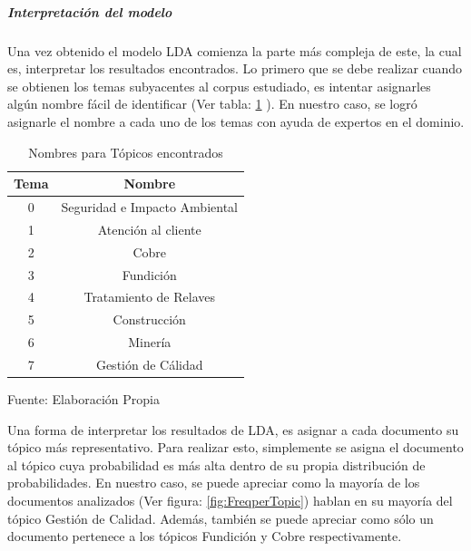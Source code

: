     \subparagraph{Interpretación del modelo}
    \subparagraph*{}
    Una vez obtenido el modelo LDA comienza la parte más compleja de este, la cual es, interpretar los resultados encontrados. Lo primero que se debe realizar cuando se obtienen los temas subyacentes al corpus estudiado, es intentar asignarles algún nombre fácil de identificar (Ver tabla: \ref{table:Topics_Name} ). En nuestro caso, se logró asignarle el nombre a cada uno de los temas con ayuda de expertos en el dominio.
    
    \begin{table}[H]
    \centering
    \begin{tabular}{|c|c|}
    \hline
    \textbf{Tema} & \textbf{Nombre}               \\ \hline
    0             & Seguridad e Impacto Ambiental \\ \hline
    1             & Atención al cliente           \\ \hline
    2             & Cobre                          \\ \hline
    3             & Fundición                     \\ \hline
    4             & Tratamiento de Relaves        \\ \hline
    5             & Construcción        \\ \hline
    6             & Minería                              \\ \hline
    7             & Gestión de Cálidad            \\ \hline
    \end{tabular}
    \caption{\label{table:Topics_Name} Nombres para Tópicos encontrados} Fuente: Elaboración Propia
    \end{table}
    
    Una forma de interpretar los resultados de LDA, es asignar a cada documento su tópico más representativo. Para realizar esto, simplemente se asigna el documento al tópico cuya probabilidad es más alta dentro de su propia distribución de probabilidades. En nuestro caso, se puede apreciar como la mayoría de los documentos analizados (Ver figura: \ref{fig:FreqperTopic}) hablan en su mayoría del tópico Gestión de Calidad. Además, también se puede apreciar como sólo un documento pertenece a los tópicos Fundición y Cobre respectivamente.
    
